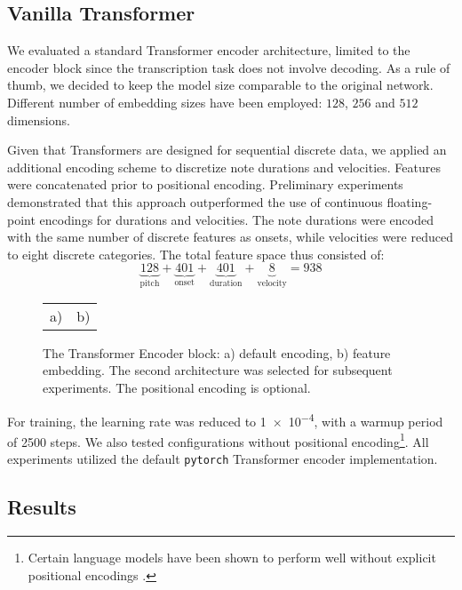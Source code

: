 \subsection{Vanilla Transformer}

We evaluated a standard Transformer encoder architecture, limited to the encoder block since the transcription task does not involve decoding. As a rule of thumb, we decided to keep the model size comparable to the original network. Different number of embedding sizes have been employed: $128$, $256$ and $512$ dimensions. 

Given that Transformers are designed for sequential discrete data, we applied an additional encoding scheme to discretize note durations and velocities. Features were concatenated prior to positional encoding. Preliminary experiments demonstrated that this approach outperformed the use of continuous floating-point encodings for durations and velocities. The note durations were encoded with the same number of discrete features as onsets, while velocities were reduced to eight discrete categories. The total feature space thus consisted of: \[\underbrace{128}_{\textrm{pitch}}+\underbrace{401}_{\textrm{onset}}+\underbrace{401}_{\textrm{duration}}+\underbrace{8}_{\textrm{velocity}} = 938\]

\begin{figure}[ht!]
\centering
\begin{tabular}{cc}a)
 & b)

\end{tabular}
\caption[The Transformer Encoder block.]{The Transformer Encoder block: a) default encoding, b) feature embedding. The second architecture was selected for subsequent experiments. The positional encoding is optional.}
\label{vanilla_transformer_encoder_with_embedding}
\end{figure}

For training, the learning rate was reduced to \num{1e-4}, with a warmup period of 2500 steps. We also tested configurations without positional encoding\footnote{Certain language models have been shown to perform well without explicit positional encodings \cite{Haviv2022}.}. All experiments utilized the default \texttt{pytorch} Transformer encoder implementation.

\subsection{Results}

